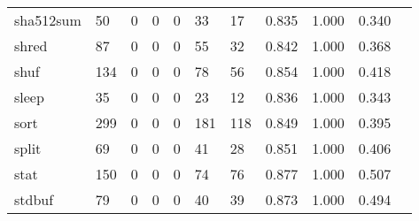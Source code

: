 \begin{longtable}{lp{1.10cm}p{1.10cm}p{1.10cm}p{1.10cm}p{1.10cm}p{1.10cm}p{1.10cm}p{1.10cm}p{1.10cm}p{1.10cm}}
sha512sum &                     50 &                                  0 &                                 0 &                                0 &                                33 &                              17 &                          0.835 &                                 1.000 &                               0.340 \\
shred     &                     87 &                                  0 &                                 0 &                                0 &                                55 &                              32 &                          0.842 &                                 1.000 &                               0.368 \\
shuf      &                    134 &                                  0 &                                 0 &                                0 &                                78 &                              56 &                          0.854 &                                 1.000 &                               0.418 \\
sleep     &                     35 &                                  0 &                                 0 &                                0 &                                23 &                              12 &                          0.836 &                                 1.000 &                               0.343 \\
sort      &                    299 &                                  0 &                                 0 &                                0 &                               181 &                             118 &                          0.849 &                                 1.000 &                               0.395 \\
split     &                     69 &                                  0 &                                 0 &                                0 &                                41 &                              28 &                          0.851 &                                 1.000 &                               0.406 \\
stat      &                    150 &                                  0 &                                 0 &                                0 &                                74 &                              76 &                          0.877 &                                 1.000 &                               0.507 \\
stdbuf    &                     79 &                                  0 &                                 0 &                                0 &                                40 &                              39 &                          0.873 &                                 1.000 &                               0.494 \\

\end{longtable}
